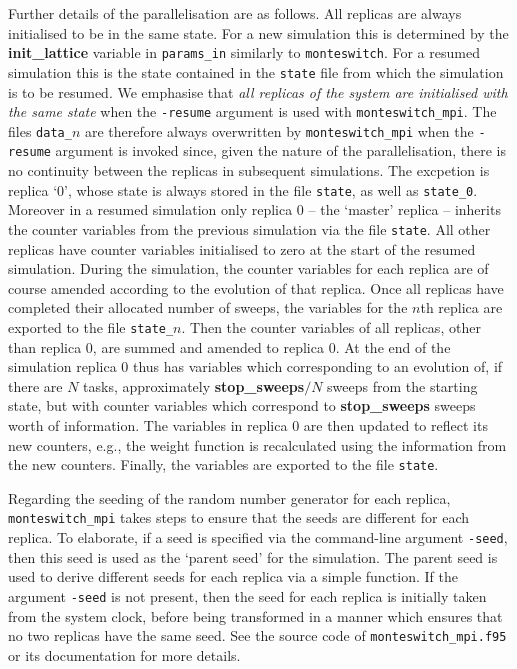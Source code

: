 \documentclass{report}
\begin{document}
Further details of the parallelisation are as follows. All replicas are always initialised to be in the same state. For a new simulation this is 
determined by the \textbf{init\_lattice} variable in \texttt{params\_in} similarly to \texttt{monteswitch}. For a resumed simulation this is the state 
contained in the \texttt{state} file from which the simulation is to be resumed. We emphasise that \emph{all replicas of the system are initialised with 
the same state} when the \texttt{-resume} argument is used with \texttt{monteswitch\_mpi}. 
The files \texttt{data\_}$n$ are therefore always overwritten by \texttt{monteswitch\_mpi} when the \texttt{-resume} argument is
invoked since, given the nature of the parallelisation, there is no continuity between the replicas in subsequent simulations. The excpetion is replica `0',
whose state is always stored in the file \texttt{state}, as well as \texttt{state\_0}.
%
Moreover in a resumed simulation only replica 0 -- the `master' replica -- inherits the counter variables from the previous 
simulation via the file \texttt{state}. All other replicas have counter variables initialised to zero at the start of the resumed simulation.
During the simulation, the counter variables for each replica are of course amended according to the evolution of that replica. Once all replicas have
completed their allocated number of sweeps, the variables for the $n$th replica are exported to the file \texttt{state\_}$n$. Then 
the counter variables of all replicas, other than replica 0, are summed and amended to replica 0. At the end of the simulation replica 0 thus has
variables which corresponding to an evolution of, if there are $N$ tasks, approximately \textbf{stop\_sweeps}$/N$ sweeps from the starting state, 
but with counter variables which correspond to \textbf{stop\_sweeps} sweeps worth of information. The variables in replica 0 are then updated to reflect 
its new counters, e.g., the weight function is recalculated using the information from the new counters. Finally, the variables are
exported to the file \texttt{state}.

Regarding the seeding of the random number generator for each replica, \texttt{monteswitch\_mpi} takes steps to ensure that the seeds are
different for each replica. To elaborate, if a seed is specified via the command-line argument \texttt{-seed}, then this seed is
used as the `parent seed' for the simulation. The parent seed is used to derive different seeds for each replica via a simple function. If the
argument \texttt{-seed} is not present, then the seed for each replica is initially taken from the system clock, before being transformed
in a manner which ensures that no two replicas have the same seed. See the source code of \texttt{monteswitch\_mpi.f95} or its documentation
for more details.
\end{document}
